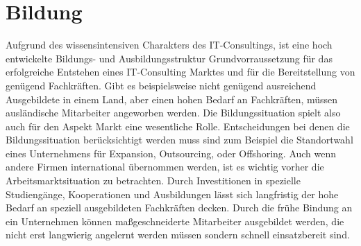 


\chapter{Bildung}
Aufgrund des wissensintensiven Charakters des IT-Consultings, ist eine hoch entwickelte Bildungs- und Ausbildungsstruktur Grundvorraussetzung für das erfolgreiche Entstehen eines IT-Consulting Marktes und für die Bereitstellung von genügend Fachkräften.
Gibt es beispielsweise nicht genügend ausreichend Ausgebildete in einem Land, aber einen hohen Bedarf an Fachkräften, müssen ausländische Mitarbeiter angeworben werden. Die Bildungssituation spielt also auch für den Aspekt Markt eine wesentliche Rolle.
Entscheidungen bei denen die Bildungssituation berücksichtigt werden muss sind zum Beispiel die Standortwahl eines Unternehmens für Expansion, Outsourcing, oder Offshoring. Auch wenn andere Firmen international übernommen werden, ist es wichtig vorher die Arbeitsmarktsituation zu betrachten. Durch Investitionen in spezielle Studiengänge, Kooperationen und Ausbildungen lässt sich langfristig der hohe Bedarf an speziell ausgebildeten Fachkräften decken. Durch die frühe Bindung an ein Unternehmen können maßgeschneiderte Mitarbeiter ausgebildet werden, die nicht erst langwierig angelernt werden müssen sondern schnell einsatzbereit sind.

